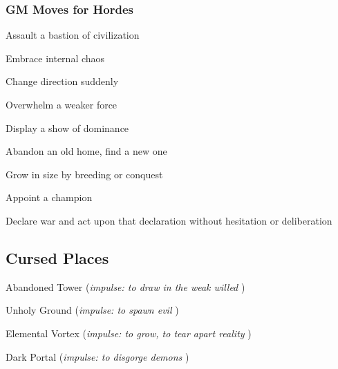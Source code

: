        
\stopitemize
       
\subsubsection{GM Moves for Hordes}     
       
\startitemize[1,packed]
         
\item Assault a bastion of civilization

         
\item Embrace internal chaos

         
\item Change direction suddenly

         
\item Overwhelm a weaker force

         
\item Display a show of dominance

         
\item Abandon an old home, find a new one

         
\item Grow in size by breeding or conquest

         
\item Appoint a champion

         
\item Declare war and act upon that declaration without hesitation or deliberation

       
\stopitemize
       
\subsection{Cursed Places}    
       
\startitemize[1,packed]
         
\item Abandoned Tower ({\em impulse: to draw in the weak willed} )

         
\item Unholy Ground ({\em impulse: to spawn evil} )

         
\item Elemental Vortex ({\em impulse: to grow, to tear apart reality} )

         
\item Dark Portal ({\em impulse: to disgorge demons} )

